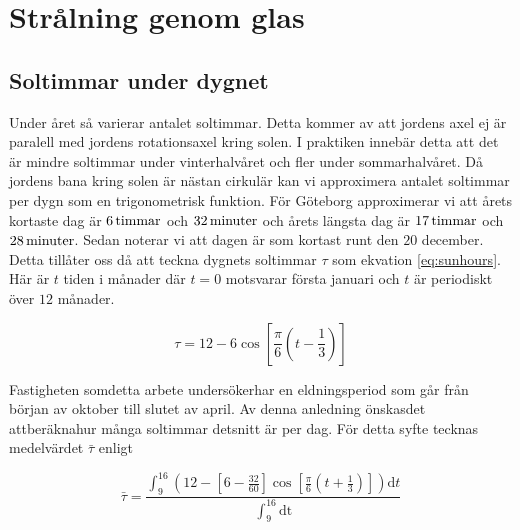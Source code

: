\section{Strålning genom glas}\label{sec:sunthroughwindowsmethod}


\subsection{Soltimmar under dygnet}
\label{subsec:sunhours}
Under året så varierar antalet soltimmar. Detta kommer av att jordens axel ej är paralell
med jordens rotationsaxel kring solen. I praktiken innebär detta att det är mindre soltimmar
under vinterhalvåret och fler under sommarhalvåret. Då jordens bana kring solen är nästan
cirkulär kan vi approximera antalet soltimmar per dygn som en trigonometrisk funktion.
För Göteborg approximerar vi att årets kortaste dag är $\unit[6]{ timmar}$ och $\unit[32]{minuter}$ och årets längsta
dag är $\unit[17]{ timmar}$ och $\unit[28]{ minuter}$. \cite{sunup} Sedan noterar vi att dagen är som kortast runt den $20$
december.
Detta tillåter oss då att teckna dygnets soltimmar $\tau$ som ekvation \eqref{eq:sunhours}. Här
är $t$ tiden i månader där $t=0$ motsvarar första januari och $t$ är periodiskt över $12$ månader.

\begin{equation}
\label{eq:sunhours}
\tau = 12 - 6\cos\left[\frac{\pi}{6}\left(t-\frac{1}{3}\right)\right]
\end{equation}

\noindent
Fastigheten somdetta arbete undersökerhar en eldningsperiod som går från början av oktober
till slutet av april. Av denna anledning önskasdet attberäknahur många soltimmar detsnitt är per
dag. För detta syfte tecknas medelvärdet $\bar{\tau}$ enligt

\begin{equation}
\label{eq:taubar}
\bar{\tau}= \frac{ \int^{16}_9 \left(12 - \left[6-\frac{32}{60}\right]\cos\left[\frac{\pi}{6}\left(t+
\frac{1}{3}\right)\right]\right)\mathrm{d}t}{\int^{16}_9 \mathrm{dt}}
\end{equation}

